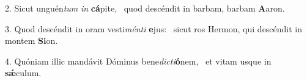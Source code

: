 2. Sicut unguén\textit{tum} \textit{in} \textbf{cá}pite, \ast\  quod descéndit in barbam, barbam \textbf{A}aron.\

3. Quod descéndit in oram vesti\textit{mén}\textit{ti} \textbf{e}jus: \ast\  sicut ros Hermon, qui descéndit in montem \textbf{Si}on.\

4. Quóniam illic mandávit Dóminus bene\textit{dic}\textit{ti}\textbf{ó}nem, \ast\  et vitam usque in \textbf{sǽ}culum.\

